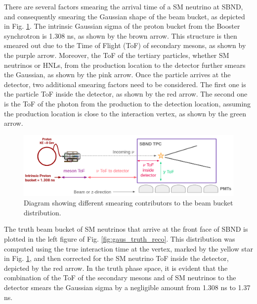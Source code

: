 There are several factors smearing the arrival time of a SM neutrino at SBND, and consequently smearing the Gaussian shape of the beam bucket, as depicted in Fig. \ref{fig:smearing_factors}.
The intrinsic Gaussian sigma of the proton bucket from the Booster synchrotron is 1.308 ns, as shown by the brown arrow.
This structure is then smeared out due to the Time of Flight (ToF) of secondary mesons, as shown by the purple arrow.
Moreover, the ToF of the tertiary particles, whether SM neutrinos or HNLs, from the production location to the detector further smears the Gaussian, as shown by the pink arrow.
Once the particle arrives at the detector, two additional smearing factors need to be considered.
The first one is the particle ToF inside the detector, as shown by the red arrow.
The second one is the ToF of the photon from the production to the detection location, assuming the production location is close to the interaction vertex, as shown by the green arrow.

\begin{figure}[h!]
    \centering
    \includegraphics[width=1.0\textwidth]{smearing_factors.png}
    \caption{Diagram showing different smearing contributors to the beam bucket distribution.}
    \label{fig:smearing_factors}
\end{figure}

The truth beam bucket of SM neutrinos that arrive at the front face of SBND is plotted in the left figure of Fig. \ref{fig:gaus_truth_reco}.
This distribution was computed using the true interaction time at the vertex, marked by the yellow star in Fig. \ref{fig:smearing_factors}, and then corrected for the SM neutrino ToF inside the detector, depicted by the red arrow.
In the truth phase space, it is evident that the combination of the ToF of the secondary mesons and of SM neutrinos to the detector smears the Gaussian sigma by a negligible amount from 1.308 ns to 1.37 ns.

